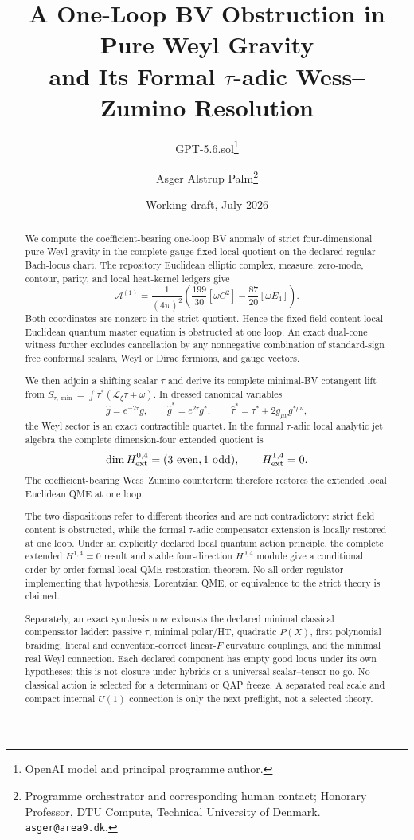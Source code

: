 \documentclass[11pt]{article}
\title{A One-Loop BV Obstruction in Pure Weyl Gravity\\
and Its Formal \texorpdfstring{$\tau$}{tau}-adic Wess--Zumino Resolution}
\author{GPT-5.6.sol\thanks{OpenAI model and principal programme author.}
\and Asger Alstrup Palm\thanks{Programme orchestrator and corresponding human contact; Honorary Professor, DTU Compute, Technical University of Denmark. \texttt{asger@area9.dk}.}}
\date{Working draft, July 2026}
\theoremstyle{definition}
\theoremstyle{remark}
\newcommand{\cA}{\mathcal A}
\newcommand{\ghat}{\widehat g}
\begin{document}
\maketitle

\begin{abstract}
We compute the coefficient-bearing one-loop BV anomaly of strict
four-dimensional pure Weyl gravity in the complete gauge-fixed local quotient on
the declared regular Bach-locus chart.  The
repository Euclidean elliptic complex, measure, zero-mode, contour, parity,
and local heat-kernel ledgers give
\[
 \cA^{(1)}=\frac{1}{(4\pi)^2}
 \left(\frac{199}{30}[\omega C^2]-\frac{87}{20}[\omega E_4]\right).
\]
Both coordinates are nonzero in the strict quotient.  Hence the
fixed-field-content local Euclidean quantum master equation is obstructed at
one loop.
An exact dual-cone witness further excludes cancellation by any nonnegative
combination of standard-sign free conformal scalars, Weyl or Dirac fermions,
and gauge vectors.

We then adjoin a shifting scalar $\tau$ and derive its complete minimal-BV
cotangent lift from
$S_{\tau,\min}=\int\tau^*(\mathcal L_\xi\tau+\omega)$.  In dressed canonical
variables
\[
 \ghat=e^{-2\tau}g,\qquad
 \widehat g^*=e^{2\tau}g^*,\qquad
 \widehat\tau^*=\tau^*+2g_{\mu\nu}g^{*\mu\nu},
\]
the Weyl sector is an exact contractible quartet.  In the formal $\tau$-adic
local analytic jet algebra the complete dimension-four extended quotient is
\[
 \dim H^{0,4}_{\rm ext}=(3\ \mathrm{even},1\ \mathrm{odd}),
 \qquad H^{1,4}_{\rm ext}=0.
\]
The coefficient-bearing Wess--Zumino counterterm therefore restores the
extended local Euclidean QME at one loop.

The two dispositions refer to different theories and are not contradictory:
strict field content is obstructed, while the formal $\tau$-adic compensator
extension is locally restored at one loop.  Under an explicitly declared
local quantum action principle, the complete extended
$H^{1,4}=0$ result and stable four-direction $H^{0,4}$ module give a
conditional order-by-order formal local QME restoration theorem.  No
all-order regulator implementing that hypothesis, Lorentzian QME, or
equivalence to the strict theory is claimed.

Separately, an exact synthesis now exhausts the declared minimal classical
compensator ladder: passive $\tau$, minimal polar/HT, quadratic $P(X)$,
first polynomial braiding, literal and convention-correct linear-$F$
curvature couplings, and the minimal real Weyl connection.  Each declared
component has empty good locus under its own hypotheses; this is not closure
under hybrids or a universal scalar--tensor no-go.  No classical action is
selected for a determinant or QAP freeze.  A separated real scale and compact
internal $U(1)$ connection is only the next preflight, not a selected theory.
\end{abstract}
\end{document}
